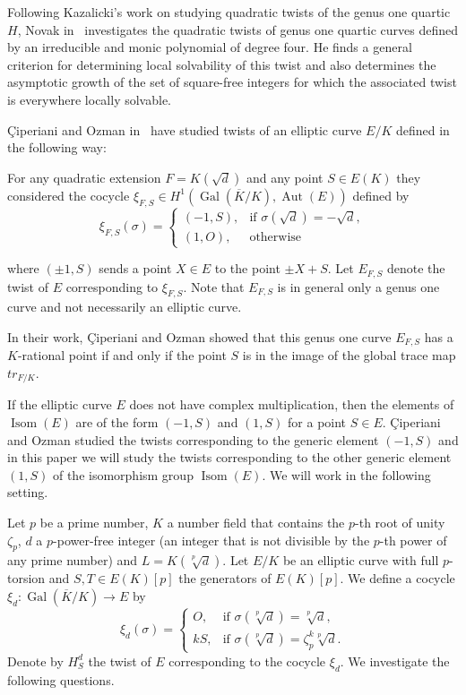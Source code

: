 \documentclass[a4paper, 12pt]{amsart}
\theoremstyle{definition}
\theoremstyle{remark}
\newcommand{\GalK}{\operatorname{Gal}(\overline{K}/K)}
\numberwithin{equation}{section}
\begin{document}
Following Kazalicki's work on studying quadratic twists of the genus one quartic $H$, Novak in~\cite{MR4902719} investigates the quadratic twists of genus one quartic curves defined by an irreducible and monic polynomial of degree four. He finds a general criterion for determining local solvability of this twist and also determines the asymptotic growth of the set of square-free integers for which the associated twist is everywhere locally solvable.

Çiperiani and Ozman in~\cite{ciperiani2015local} have studied twists of an elliptic curve $E/K$ defined in the following way:

For any quadratic extension $F=K(\sqrt{d})$ and any point $S\in E(K)$ they considered the cocycle $\xi_{F,S} \in H^1\left(\GalK, \operatorname{Aut}(E)\right)$ defined by
        \[
            \xi_{F,S} (\sigma)=
            \begin{cases}
                (-1,S), & \text{if } \sigma(\sqrt{d})=-\sqrt{d}, \\
                (1,O), & \text{otherwise } 
            \end{cases}
        \]

where $(\pm 1,S)$ sends a point $X \in E$ to the point $\pm X+S$.
Let $E_{F,S}$ denote the twist of $E$ corresponding to $\xi_{F,S}$. Note that $E_{F,S}$ is in general only a genus one curve and not necessarily an elliptic curve. 

In their work, Çiperiani and Ozman showed that this genus one curve $E_{F,S}$ has a $K$-rational point if and only if the point $S$ is in the image of the global trace map $tr_{F/K}$.

If the elliptic curve $E$ does not have complex multiplication, then the elements of $\operatorname{Isom}(E)$ are of the form $(-1,S)$ and $(1,S)$ for a point $S \in E$. Çiperiani and Ozman studied the twists corresponding to the generic element $(-1, S)$  and in this paper we will study the twists corresponding to the other generic element $(1, S)$ of the isomorphism group $\operatorname{Isom}(E)$. We will work in the following setting.

Let $p$ be a prime number, $K$ a number field that contains the $p$-th root of unity $\zeta_p$, $d$ a $p$-power-free integer (an integer that is not divisible by the $p$-th power of any prime number) and $L=K(\sqrt[p]{d})$.
Let $E/K$ be an elliptic curve with full $p$-torsion and $S,T \in E(K)[p]$ the generators of $E(K)[p]$. We define a cocycle $\xi_d : \GalK \to E$ by
\[
    \xi_d (\sigma)=
    \begin{cases}
        O, & \text{if } \sigma(\sqrt[p]{d})=\sqrt[p]{d}, \\
        kS, & \text{if } \sigma(\sqrt[p]{d})=\zeta_p^k\sqrt[p]{d}.
    \end{cases}
\]
Denote by $H_S^d$ the twist of $E$ corresponding to the cocycle $\xi_d$. We investigate the following questions.
\end{document}
